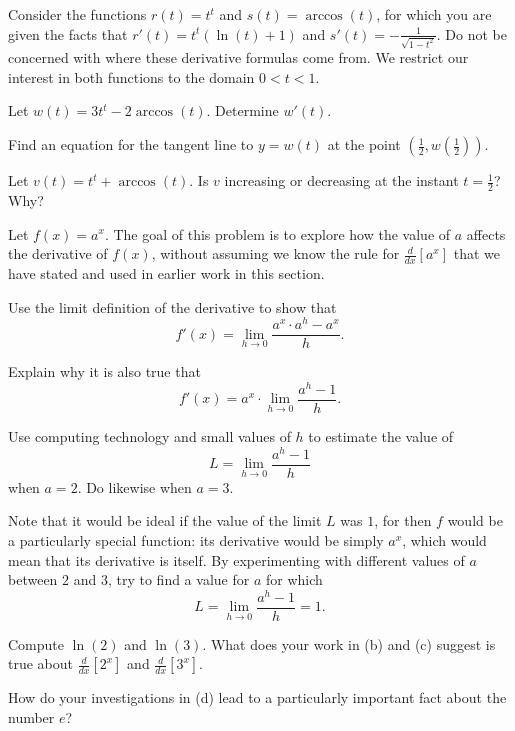 \begin{exercises}
\item Consider the functions $r(t) = t^t$ and $s(t) = \arccos(t)$, for which you are given the facts that $r'(t) = t^t(\ln(t) + 1)$ and $s'(t) = -\frac{1}{\sqrt{1-t^2}}$.  Do not be concerned with where these derivative formulas come from.  We restrict our interest in both functions to the domain $0 < t < 1$.
\ba
	\item Let $w(t) = 3t^t - 2\arccos(t)$.  Determine $w'(t)$.
	\item Find an equation for the tangent line to $y = w(t)$ at the point $(\frac{1}{2}, w(\frac{1}{2}))$.
	\item Let $v(t) = t^t + \arccos(t)$.  Is $v$ increasing or decreasing at the instant $t = \frac{1}{2}$?  Why?
\ea


\item Let $f(x) = a^x$.  The goal of this problem is to explore how the value of $a$ affects the derivative of $f(x)$, without assuming we know the rule for $\frac{d}{dx}[a^x]$ that we have stated and used in earlier work in this section.
\ba
	\item Use the limit definition of the derivative to show that
	$$f'(x) = \lim_{h \to 0} \frac{a^x \cdot a^h - a^x}{h}.$$
	\item Explain why it is also true that
	$$f'(x) = a^x \cdot \lim_{h \to 0} \frac{a^h - 1}{h}.$$
	\item Use computing technology and small values of $h$ to estimate the value of 
	$$L = \lim_{h \to 0} \frac{a^h - 1}{h}$$
	when $a = 2$.  Do likewise when $a = 3$.
	\item Note that it would be ideal if the value of the limit $L$ was $1$, for then $f$ would be a particularly special function:  its derivative would be simply $a^x$, which would mean that its derivative is itself.  By experimenting with different values of $a$ between $2$ and $3$, try to find a value for $a$ for which 
	$$L = \lim_{h \to 0} \frac{a^h - 1}{h} = 1.$$
	\item Compute $\ln(2)$ and $\ln(3)$.  What does your work in (b) and (c) suggest is true about $\frac{d}{dx}[2^x]$ and $\frac{d}{dx}[3^x]$.
	\item How do your investigations in (d) lead to a particularly important fact about the number $e$?
\ea

\end{exercises}
\afterexercises